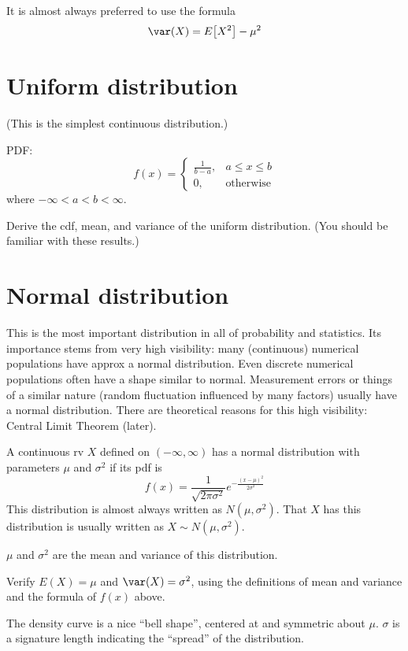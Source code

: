 \documentclass[12pt]{article}
\begin{document}
It is almost always preferred to use the formula
\[
\var(X) = E\bigl[X^2\bigr] - \mu^2
\]

\section{Uniform distribution}

(This is the simplest continuous distribution.)

PDF:
\[
f(x) = \begin{cases}
    \frac{1}{b-a},  & a \le x \le b\\
    0,              & \text{otherwise}
    \end{cases}
\]
where $-\infty < a < b < \infty$.

\example Derive the cdf, mean, and variance of the uniform distribution.
(You should be familiar with these results.)

\section{Normal distribution}

This is the most important distribution in all of probability and
statistics.
Its importance stems from very high visibility:
many (continuous) numerical populations have approx a normal distribution.
Even discrete numerical populations often have a shape similar to
normal.
Measurement errors or things of a similar nature (random fluctuation
influenced by many factors) usually have a normal distribution.
There are theoretical reasons for this high visibility:
Central Limit Theorem (later).

\alert[Definition]%
A continuous rv $X$ defined on $(-\infty, \infty)$ has a
normal distribution with parameters $\mu$ and $\sigma^2$
if its pdf is
\[
f(x) = \frac{1}{\sqrt{2\pi \sigma^2}} e^{-\frac{(x-\mu)^2}{2\sigma^2}}
\]
This distribution is almost always written as $N(\mu, \sigma^2)$.
That $X$ has this distribution is usually written as
$X \sim N(\mu, \sigma^2)$.

$\mu$ and $\sigma^2$ are the mean and variance of this distribution.

\exercise
Verify $E(X) = \mu$ and $\var(X) = \sigma^2$,
using the definitions of mean and variance and the formula of
$f(x)$ above.

The density curve is a nice ``bell shape'',
centered at and symmetric about $\mu$.
$\sigma$ is a signature length indicating the ``spread'' of the
distribution.
\end{document}
